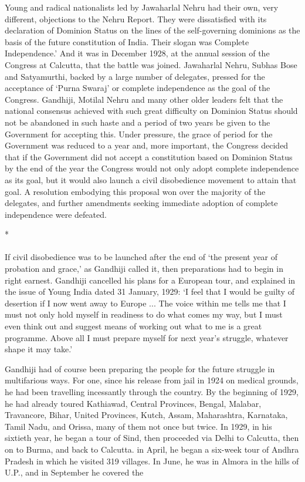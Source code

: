 Young and radical nationalists led by Jawaharlal Nehru had their own, very different, objections to the Nehru Report. They were dissatisfied with its declaration of Dominion Status on the lines of the self-governing dominions as the basis of the future constitution of India. Their slogan was Complete Independence.' And it was in December 1928, at the annual session of the Congress at Calcutta, that the battle was joined. Jawaharlal Nehru, Subhas Bose and Satyamurthi, backed by a large number of delegates, pressed for the acceptance of `Purna Swaraj' or complete independence as the goal of the Congress. Gandhiji, Motilal Nehru and many other older leaders felt that the national consensus achieved with such great difficulty on Dominion Status should not be abandoned in such haste and a period of two years be given to the Government for accepting this. Under pressure, the grace of period for the Government was reduced to a year and, more important, the Congress decided that if the Government did not accept a constitution based on Dominion Status by the end of the year the Congress would not only adopt complete independence as its goal, but it would also launch a civil disobedience movement to attain that goal. A resolution embodying this proposal won over the majority of the delegates, and further amendments seeking immediate adoption of complete independence were defeated.

\begin{center}*\end{center}

\paragraph*{}

If civil disobedience was to be launched after the end of `the present year of probation and grace,' as Gandhiji called it, then preparations had to begin in right earnest. Gandhiji cancelled his plans for a European tour, and explained in the issue of Young India dated 31 January, 1929: `I feel that I would be guilty of desertion if I now went away to Europe ... The voice within me tells me that I must not only hold myself in readiness to do what comes my way, but I must even think out and suggest means of working out what to me is a great programme. Above all I must prepare myself for next year's struggle, whatever shape it may take.' 

Gandhiji had of course been preparing the people for the future struggle in multifarious ways. For one, since his release from jail in 1924 on medical grounds, he had been travelling incessantly through the country. By the beginning of 1929, he had already toured Kathiawad, Central Provinces, Bengal, Malabar, Travancore, Bihar, United Provinces, Kutch, Assam, Maharashtra, Karnataka, Tamil Nadu, and Orissa, many of them not once but twice. In 1929, in his sixtieth year, he began a tour of Sind, then proceeded via Delhi to Calcutta, then on to Burma, and back to Calcutta. in April, he began a six-week tour of Andhra Pradesh in which he visited 319 villages. In June, he was in Almora in the hills of U.P., and in September he covered the 


